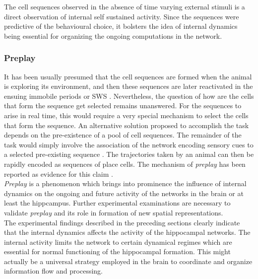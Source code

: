 The cell sequences observed in the absence of time varying external stimuli is a direct observation of internal self sustained activity. Since the sequences were predictive of the behavioural choice, it bolsters the idea of internal dynamics being essential for organizing the ongoing computations in the network.

\subsubsection{Preplay}
It has been usually presumed that the cell sequences are formed when the animal is exploring its environment, and then these sequences are later reactivated in the ensuing immobile periods or SWS \cite{Foster2006, Davidson2009}. Nevertheless, the question of how are the cells that form the sequence get selected remains unanswered. For the sequences to arise in real time, this would require a very special mechanism to select the cells that form the sequence. An alternative solution proposed to accomplish the task depends on the pre-existence of a pool of cell sequences. The remainder of the task would simply involve the association of the network encoding sensory cues to a selected pre-existing sequence \cite{Itskov2011a}. The trajectories taken by an animal can then be rapidly encoded as sequences of place cells. The mechanism of \emph{preplay} has been reported as evidence for this claim  \cite{Dragoi2011, Dragoi2013a}.\\
\emph{Preplay} is a phenomenon which brings into prominence the influence of internal dynamics on the ongoing and future activity of the networks in the brain or at least the hippcampus. Further experimental examinations are necessary to validate \emph{preplay} and its role in formation of new spatial representations. \\

The experimental findings described in the preceding sections clearly indicate that the internal dynamics affects the activity of the hippocampal networks. The internal activity limits the network to certain dynamical regimes which are essential for normal functioning of the hippocampal formation. This might actually be a universal strategy employed in the brain to coordinate and organize information flow and processing.\\

